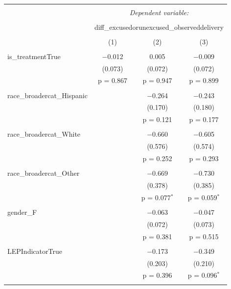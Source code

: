 
\begin{table}[!htbp] \centering 
  \caption{} 
  \label{} 
\begin{tabular}{@{\extracolsep{5pt}}lccc} 
\\[-1.8ex]\hline 
\hline \\[-1.8ex] 
 & \multicolumn{3}{c}{\textit{Dependent variable:}} \\ 
\cline{2-4} 
\\[-1.8ex] & \multicolumn{3}{c}{diff\_excusedorunexcused\_observeddelivery} \\ 
\\[-1.8ex] & (1) & (2) & (3)\\ 
\hline \\[-1.8ex] 
 is\_treatmentTrue & $-$0.012 & 0.005 & $-$0.009 \\ 
  & (0.073) & (0.072) & (0.072) \\ 
  & p = 0.867 & p = 0.947 & p = 0.899 \\ 
  & & & \\ 
 race\_broadercat\_Hispanic &  & $-$0.264 & $-$0.243 \\ 
  &  & (0.170) & (0.180) \\ 
  &  & p = 0.121 & p = 0.177 \\ 
  & & & \\ 
 race\_broadercat\_White &  & $-$0.660 & $-$0.605 \\ 
  &  & (0.576) & (0.574) \\ 
  &  & p = 0.252 & p = 0.293 \\ 
  & & & \\ 
 race\_broadercat\_Other &  & $-$0.669 & $-$0.730 \\ 
  &  & (0.378) & (0.385) \\ 
  &  & p = 0.077$^{*}$ & p = 0.059$^{*}$ \\ 
  & & & \\ 
 gender\_F &  & $-$0.063 & $-$0.047 \\ 
  &  & (0.072) & (0.073) \\ 
  &  & p = 0.381 & p = 0.515 \\ 
  & & & \\ 
 LEPIndicatorTrue &  & $-$0.173 & $-$0.349 \\ 
  &  & (0.203) & (0.210) \\ 
  &  & p = 0.396 & p = 0.096$^{*}$ \\ 
  & & & \\ 

\end{tabular}
\end{table}
